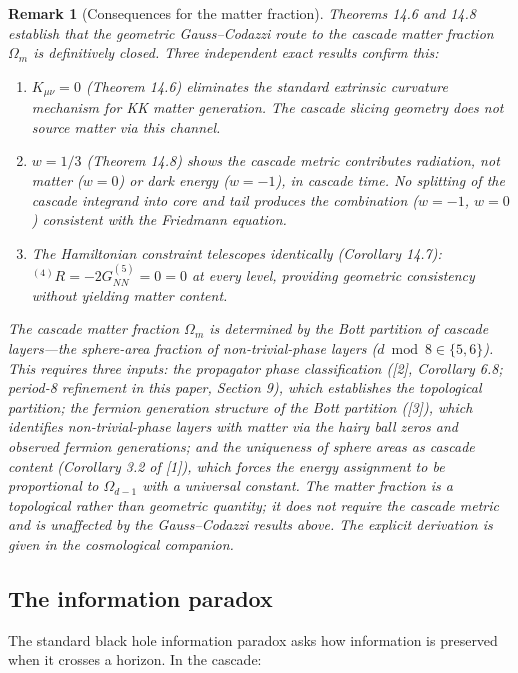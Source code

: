 \documentclass[12pt,a4paper]{article}
\newtheorem*{remark}{Remark}
\begin{document}
\begin{remark}[Consequences for the matter fraction]
Theorems 14.6 and 14.8 establish
that the geometric Gauss--Codazzi route to the cascade matter fraction $\Omega_m$ is definitively
closed. Three independent exact results confirm this:
\begin{enumerate}
\item $K_{\mu\nu} = 0$ (Theorem 14.6) eliminates the standard extrinsic curvature mechanism for
KK matter generation. The cascade slicing geometry does not source matter via this
channel.
\item $w = 1/3$ (Theorem 14.8) shows the cascade metric contributes radiation, not matter
($w = 0$) or dark energy ($w = -1$), in cascade time. No splitting of the cascade
integrand into core and tail produces the combination ($w = -1$, $w = 0$) consistent
with the Friedmann equation.
\item The Hamiltonian constraint telescopes identically (Corollary 14.7): ${}^{(4)}R = -2G^{(5)}_{NN} =
0 = 0$ at every level, providing geometric consistency without yielding matter content.
\end{enumerate}
The cascade matter fraction $\Omega_m$ is determined by the Bott partition of cascade layers---the sphere-area fraction of non-trivial-phase layers ($d \bmod 8 \in \{5, 6\}$). This requires
three inputs: the propagator phase classification ([2], Corollary 6.8; period-8 refinement in this paper, Section 9), which establishes the
topological partition; the fermion generation structure of the Bott partition ([3]), which
identifies non-trivial-phase layers with matter via the hairy ball zeros and observed fermion
generations; and the uniqueness of sphere areas as cascade content (Corollary 3.2 of [1]),
which forces the energy assignment to be proportional to $\Omega_{d-1}$ with a universal constant.
The matter fraction is a topological rather than geometric quantity; it does not require
the cascade metric and is unaffected by the Gauss--Codazzi results above. The explicit
derivation is given in the cosmological companion.
\end{remark}

\subsection{The information paradox}

The standard black hole information paradox asks how information is preserved when it
crosses a horizon. In the cascade:
\end{document}
